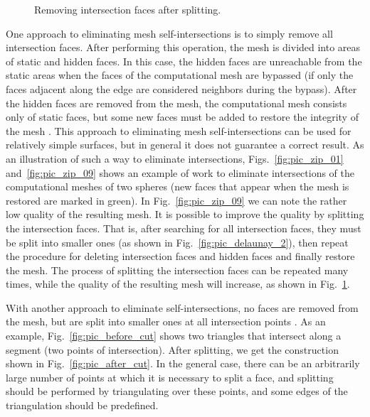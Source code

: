 \documentclass[
11pt,
tightenlines,
twoside,
onecolumn,
nofloats,
nobibnotes,
nofootinbib,
superscriptaddress,
noshowpacs,
centertags]
{revtex4}
\begin{document}
\begin{figure}[h]
\begin{minipage}[h]{0.3\textwidth}
    \caption{Removing intersection faces after splitting.}\label{fig:pic_zip_15}
  \end{minipage}
\end{figure}

One approach to eliminating mesh self-intersections is to simply remove all intersection faces.
After performing this operation, the mesh is divided into areas of static and hidden faces.
In this case, the hidden faces are unreachable from the static areas when the faces of the computational mesh are bypassed (if only the faces adjacent along the edge are considered neighbors during the bypass).
After the hidden faces are removed from the mesh, the computational mesh consists only of static faces, but some new faces must be added to restore the integrity of the mesh \cite{Charton}.
This approach to eliminating mesh self-intersections can be used for relatively simple surfaces, but in general it does not guarantee a correct result.
As an illustration of such a way to eliminate intersections,
Figs.~\ref{fig:pic_zip_01} and~\ref{fig:pic_zip_09} shows an example
of work to eliminate intersections of the computational meshes of
two spheres (new faces that appear when the mesh is restored are
marked in green).
In Fig.~\ref{fig:pic_zip_09} we can note the rather low quality of the resulting mesh.
It is possible to improve the quality by splitting the intersection faces.
That is, after searching for all intersection faces, they must be split into smaller ones (as shown in Fig.~\ref{fig:pic_delaunay_2}), then repeat the procedure for deleting intersection faces and hidden faces and finally restore the mesh.
The process of splitting the intersection faces can be repeated many times, while the quality of the resulting mesh will increase, as shown in Fig.~\ref{fig:pic_zip_15}.

With another approach to eliminate self-intersections, no faces are removed from the mesh, but are split into smaller ones at all intersection points \cite{Skvorkovska}.
As an example, Fig.~\ref{fig:pic_before_cut} shows two triangles that intersect along a segment (two points of intersection).
After splitting, we get the construction shown in Fig.~\ref{fig:pic_after_cut}.
In the general case, there can be an arbitrarily large number of points at which it is necessary to split a face, and splitting should be performed by triangulating over these points, and some edges of the triangulation should be predefined.
\end{document}
